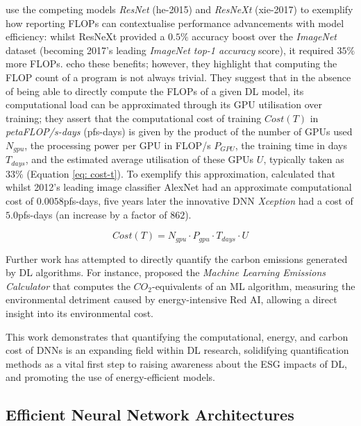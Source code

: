 \documentclass[a4paper, 11pt]{report}
\begin{document}
    \citet{schwartz-2019} use the competing models \emph{ResNet} (he-2015) and \emph{ResNeXt} (xie-2017) to exemplify how reporting FLOPs can contextualise performance advancements with model efficiency: whilst ResNeXt provided a $0.5\%$ accuracy boost over the \emph{ImageNet} dataset (becoming 2017's leading \emph{ImageNet top-1 accuracy} score), it required $35\%$ more FLOPs. \citet{amodei-2018} echo these benefits; however, they highlight that computing the FLOP count of a program is not always trivial. They suggest that in the absence of being able to directly compute the FLOPs of a given DL model, its computational load can be approximated through its GPU utilisation over training; they assert that the computational cost of training $Cost(T)$ in \emph{petaFLOP/s-days} (pfs-days) is given by the product of the number of GPUs used $N_{gpu}$, the processing power per GPU in FLOP/s $P_{GPU}$, the training time in days $T_{days}$, and the estimated average utilisation of these GPUs $U$, typically taken as $33\%$ (Equation \ref{eq: cost-t}). To exemplify this approximation, \citet{amodei-2018} calculated that whilst 2012's leading image classifier AlexNet \citep{krizhevsky-2012} had an approximate computational cost of $0.0058$pfs-days, five years later the innovative DNN \emph{Xception} \citep{chollet-2017} had a cost of $5.0$pfs-days (an increase by a factor of $862$).

    \begin{equation}
        \label{eq: cost-t}
        Cost(T) = N_{gpu} \cdot P_{gpu} \cdot T_{days} \cdot U
    \end{equation}

    Further work has attempted to directly quantify the carbon emissions generated by DL algorithms. For instance, \citet{lacoste-2019} proposed the \emph{Machine Learning Emissions Calculator} that computes the $CO_2$-equivalents of an ML algorithm, measuring the environmental detriment caused by energy-intensive Red AI, allowing a direct insight into its environmental cost.

    This work demonstrates that quantifying the computational, energy, and carbon cost of DNNs is an expanding field within DL research, solidifying quantification methods as a vital first step to raising awareness about the ESG impacts of DL, and promoting the use of energy-efficient models.


    \subsection{Efficient Neural Network Architectures}
\end{document}

